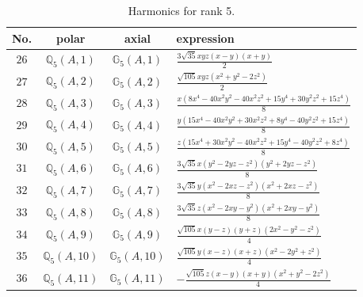 \documentclass[fleqn,8pt,landscape]{jsarticle}
\begin{document}
\begin{table}[ht!]
\begin{center}
\caption{Harmonics for rank 5.}
\renewcommand{\arraystretch}{1.3}
\begin{tabular}{cccl} \hline \hline
No. & polar & axial & expression \\ \hline
$ 26 $ & $ \mathbb{Q}_{5}(A,1) $ & $ \mathbb{G}_{5}(A,1) $ & $ \frac{3 \sqrt{35} x y z \left(x - y\right) \left(x + y\right)}{2} $ \\
$ 27 $ & $ \mathbb{Q}_{5}(A,2) $ & $ \mathbb{G}_{5}(A,2) $ & $ \frac{\sqrt{105} x y z \left(x^{2} + y^{2} - 2 z^{2}\right)}{2} $ \\
$ 28 $ & $ \mathbb{Q}_{5}(A,3) $ & $ \mathbb{G}_{5}(A,3) $ & $ \frac{x \left(8 x^{4} - 40 x^{2} y^{2} - 40 x^{2} z^{2} + 15 y^{4} + 30 y^{2} z^{2} + 15 z^{4}\right)}{8} $ \\
$ 29 $ & $ \mathbb{Q}_{5}(A,4) $ & $ \mathbb{G}_{5}(A,4) $ & $ \frac{y \left(15 x^{4} - 40 x^{2} y^{2} + 30 x^{2} z^{2} + 8 y^{4} - 40 y^{2} z^{2} + 15 z^{4}\right)}{8} $ \\
$ 30 $ & $ \mathbb{Q}_{5}(A,5) $ & $ \mathbb{G}_{5}(A,5) $ & $ \frac{z \left(15 x^{4} + 30 x^{2} y^{2} - 40 x^{2} z^{2} + 15 y^{4} - 40 y^{2} z^{2} + 8 z^{4}\right)}{8} $ \\
$ 31 $ & $ \mathbb{Q}_{5}(A,6) $ & $ \mathbb{G}_{5}(A,6) $ & $ \frac{3 \sqrt{35} x \left(y^{2} - 2 y z - z^{2}\right) \left(y^{2} + 2 y z - z^{2}\right)}{8} $ \\
$ 32 $ & $ \mathbb{Q}_{5}(A,7) $ & $ \mathbb{G}_{5}(A,7) $ & $ \frac{3 \sqrt{35} y \left(x^{2} - 2 x z - z^{2}\right) \left(x^{2} + 2 x z - z^{2}\right)}{8} $ \\
$ 33 $ & $ \mathbb{Q}_{5}(A,8) $ & $ \mathbb{G}_{5}(A,8) $ & $ \frac{3 \sqrt{35} z \left(x^{2} - 2 x y - y^{2}\right) \left(x^{2} + 2 x y - y^{2}\right)}{8} $ \\
$ 34 $ & $ \mathbb{Q}_{5}(A,9) $ & $ \mathbb{G}_{5}(A,9) $ & $ \frac{\sqrt{105} x \left(y - z\right) \left(y + z\right) \left(2 x^{2} - y^{2} - z^{2}\right)}{4} $ \\
$ 35 $ & $ \mathbb{Q}_{5}(A,10) $ & $ \mathbb{G}_{5}(A,10) $ & $ \frac{\sqrt{105} y \left(x - z\right) \left(x + z\right) \left(x^{2} - 2 y^{2} + z^{2}\right)}{4} $ \\
$ 36 $ & $ \mathbb{Q}_{5}(A,11) $ & $ \mathbb{G}_{5}(A,11) $ & $ - \frac{\sqrt{105} z \left(x - y\right) \left(x + y\right) \left(x^{2} + y^{2} - 2 z^{2}\right)}{4} $ \\
 \hline \hline
\end{tabular}
\end{center}
\end{table}
\end{document}
